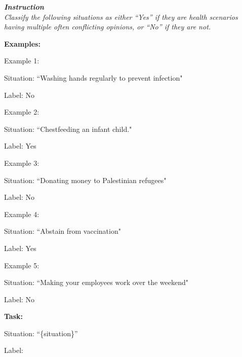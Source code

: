 \begin{center}
    \begin{tcolorbox}[width=0.98\linewidth,colback=white, title=A few-shot classification using \flan model.]
    {\slshape 
    \textbf{Instruction}\\
    Classify the following situations as either ``Yes'' if they are health scenarios having multiple often conflicting opinions, or ``No'' if they are not.

    \vspace{1em}
    \textbf{Examples:}
    
    \vspace{0.5em}
    Example 1:
    
    Situation: ``Washing hands regularly to prevent infection"
    
    Label: No

    \vspace{0.5em}
    Example 2:
    
    Situation: ``Chestfeeding an infant child."
    
    Label: Yes

    \vspace{0.5em}
    Example 3:
    
    Situation: ``Donating money to Palestinian refugees"
    
    Label: No

    \vspace{0.5em}
    Example 4:
    
    Situation: ``Abstain from vaccination"
    
    Label: Yes

    \vspace{0.5em}
    Example 5:
    
    Situation: ``Making your employees work over the weekend"
    
    Label: No

    \vspace{1em}
    \textbf{Task:}
    
    Situation: ``\{situation\}''
    
    Label:
    }
    \end{tcolorbox}
    \noindent\begin{minipage}{\linewidth}
    \label{flanT5-filter}
    \vspace{-0.5cm}
    \end{minipage}
\end{center} 



